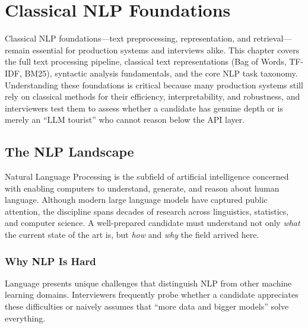 
\chapter{Classical NLP Foundations}
\label{chap:classical_foundations}

\begin{tldr}
Classical NLP foundations---text preprocessing, representation, and retrieval---remain
essential for production systems and interviews alike. This chapter covers the full text
processing pipeline, classical text representations (Bag of Words, TF-IDF, BM25), syntactic
analysis fundamentals, and the core NLP task taxonomy. Understanding these foundations is
critical because many production systems still rely on classical methods for their efficiency,
interpretability, and robustness, and interviewers test them to assess whether a candidate has
genuine depth or is merely an ``LLM tourist'' who cannot reason below the API layer.
\end{tldr}

\section{The NLP Landscape}
\label{sec:nlp_landscape}

Natural Language Processing is the subfield of artificial intelligence concerned with enabling
computers to understand, generate, and reason about human language. Although modern large
language models have captured public attention, the discipline spans decades of research
across linguistics, statistics, and computer science. A well-prepared candidate must
understand not only \emph{what} the current state of the art is, but \emph{how} and
\emph{why} the field arrived here.

\subsection{Why NLP Is Hard}
\label{sec:why_nlp_hard}

Language presents unique challenges that distinguish NLP from other machine learning
domains. Interviewers frequently probe whether a candidate appreciates these difficulties
or naively assumes that ``more data and bigger models'' solve everything.

